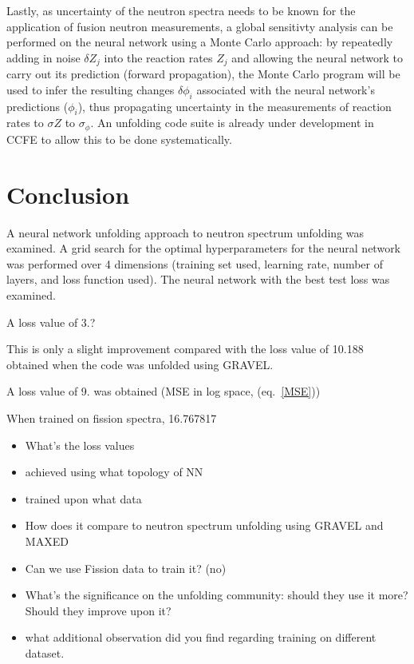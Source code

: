 \documentclass[a4paper, 12pt]{article}
\begin{document}
Lastly, as uncertainty of the neutron spectra needs to be known for the application of fusion neutron measurements, a global sensitivty analysis can be performed on the neural network using a Monte Carlo approach: by repeatedly adding in noise $\delta Z_j$ into the reaction rates $Z_j$ and allowing the neural network to carry out its prediction (forward propagation), the Monte Carlo program will be used to infer the resulting changes $\delta \phi_i$ associated with the neural network's predictions ($\phi_i$), thus propagating uncertainty in the measurements of reaction rates to $\sigma{Z}$ to $\sigma_{\phi}$. An unfolding code suite is already under development in CCFE to allow this to be done systematically.

\section{Conclusion}
A neural network unfolding approach to neutron spectrum unfolding was examined. A grid search for the optimal hyperparameters for the neural network was performed over 4 dimensions (training set used, learning rate, number of layers, and loss function used). The neural network with the best test loss was examined.%

A loss value of 3.?

This is only a slight improvement compared with the loss value of 10.188 obtained when the code was unfolded using GRAVEL.

A loss value of 9. was obtained (MSE in log space, (eq.~\ref{MSE}))

When trained on fission spectra, 16.767817 %

\begin{itemize}
    \item What's the loss values
    \item achieved using what topology of NN
    \item trained upon what data
    \item How does it compare to neutron spectrum unfolding using GRAVEL and MAXED
    \item Can we use Fission data to train it? (no)
    \item What's the significance on the unfolding community: should they use it more? Should they improve upon it?
    \item what additional observation did you find regarding training on different dataset.
\end{itemize}
\end{document}
